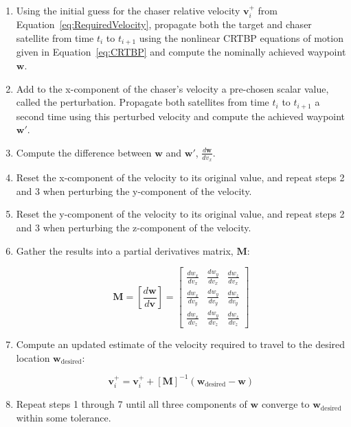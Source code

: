 \documentclass[letterpaper, preprint, paper,11pt]{AAS}	%
\begin{document}
\begin{enumerate}[leftmargin=!,labelindent=12pt,itemindent=0pt, label=Step \arabic*:]
	
	\item Using the initial guess for the chaser relative velocity \(\mathbf{v}_i^+\) from Equation~\eqref{eq:RequiredVelocity}, propagate both the target and chaser satellite from time \(t_i\) to \(t_{i+1}\) using the nonlinear CRTBP equations of motion given in Equation~\eqref{eq:CRTBP} and compute the nominally achieved waypoint \(\mathbf{w}\).
	
	\item Add to the x-component of the chaser's velocity a pre-chosen scalar value, called the perturbation.  Propagate both satellites from time \(t_i\) to \(t_{i+1}\) a second time using this perturbed velocity and compute the achieved waypoint \(\mathbf{w}'\).
	
	\item Compute the difference between \(\mathbf{w}\) and \(\mathbf{w}'\), \(\frac{d\mathbf{w}}{dv_x}\).
	
	\item Reset the x-component of the velocity to its original value, and repeat steps 2 and 3 when perturbing the y-component of the velocity.
	
	\item Reset the y-component of the velocity to its original value, and repeat steps 2 and 3 when perturbing the z-component of the velocity.
	
	\item Gather the results into a partial derivatives matrix, \(\mathbf{M}\):
	
	\begin{equation} \label{eq:ShootingMethodPartialDerivs}
		\mathbf{M} = \left[ \frac{d\mathbf{w}}{d\mathbf{v}} \right]
		= \begin{bmatrix}
			\frac{dw_x}{dv_x} & \frac{dw_y}{dv_x} & \frac{dw_z}{dv_x} \\[0.3em]
			\frac{dw_x}{dv_y} & \frac{dw_y}{dv_y} & \frac{dw_z}{dv_y} \\[0.3em]
			\frac{dw_x}{dv_z} & \frac{dw_y}{dv_z} & \frac{dw_z}{dv_z}
		\end{bmatrix}
	\end{equation}
	
	\item Compute an updated estimate of the velocity required to travel to the desired location \(\mathbf{w}_{\mathrm{desired}}\):
	
	\begin{equation} \label{eq:ShootingMethodUpdate}
		\mathbf{v}_i^+ = \mathbf{v}_i^+ + [\mathbf{M}]^{-1}(\mathbf{w}_{\mathrm{desired}} - \mathbf{w})
	\end{equation}
	
	\item Repeat steps 1 through 7 until all three components of \(\mathbf{w}\) converge to \(\mathbf{w}_{\mathrm{desired}}\) within some tolerance.
	
\end{enumerate}
\end{document}
